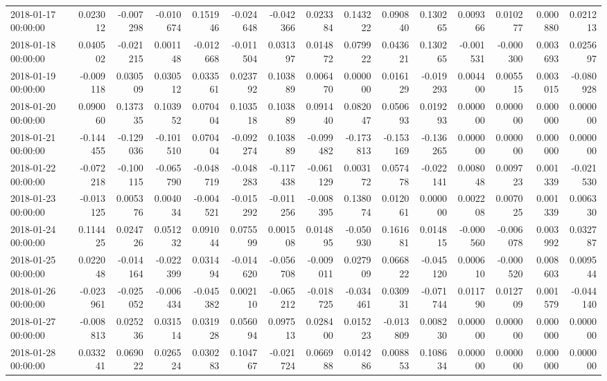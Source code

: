 \begin{tabular}{lrrrrrrrrrrrrrr}
2018-01-17 00:00:00 & 0.023012 & -0.007298 & -0.010674 & 0.151946 & -0.024648 & -0.042366 & 0.023384 & 0.143222 & 0.090840 & 0.130265 & 0.009366 & 0.010277 & 0.000880 & 0.021213 \\
2018-01-18 00:00:00 & 0.040502 & -0.021215 & 0.001148 & -0.012668 & -0.011504 & 0.031397 & 0.014872 & 0.079922 & 0.043621 & 0.130265 & -0.001531 & -0.000300 & 0.003693 & 0.025697 \\
2018-01-19 00:00:00 & -0.009118 & 0.030509 & 0.030512 & 0.033561 & 0.023792 & 0.103889 & 0.006470 & 0.000000 & 0.016129 & -0.019293 & 0.004400 & 0.005515 & 0.003015 & -0.080928 \\
2018-01-20 00:00:00 & 0.090060 & 0.137335 & 0.103952 & 0.070404 & 0.103518 & 0.103889 & 0.091440 & 0.082047 & 0.050693 & 0.019293 & 0.000000 & 0.000000 & 0.000000 & 0.000000 \\
2018-01-21 00:00:00 & -0.144455 & -0.129036 & -0.101510 & 0.070404 & -0.092274 & 0.103889 & -0.099482 & -0.173813 & -0.153169 & -0.136265 & 0.000000 & 0.000000 & 0.000000 & 0.000000 \\
2018-01-22 00:00:00 & -0.072218 & -0.100115 & -0.065790 & -0.048719 & -0.048283 & -0.117438 & -0.061129 & 0.003172 & 0.057478 & -0.022141 & 0.008048 & 0.009723 & 0.001339 & -0.021530 \\
2018-01-23 00:00:00 & -0.013125 & 0.005376 & 0.004034 & -0.004521 & -0.015292 & -0.011256 & -0.008395 & 0.138074 & 0.012061 & 0.000000 & 0.002208 & 0.007025 & 0.001339 & 0.006330 \\
2018-01-24 00:00:00 & 0.114425 & 0.024726 & 0.051232 & 0.091044 & 0.075599 & 0.001508 & 0.014895 & -0.050930 & 0.161681 & 0.014815 & -0.000560 & -0.006078 & 0.003992 & 0.032787 \\
2018-01-25 00:00:00 & 0.022048 & -0.014164 & -0.022399 & 0.031494 & -0.014620 & -0.056708 & -0.009011 & 0.027909 & 0.066822 & -0.045120 & 0.000610 & -0.000520 & 0.008603 & 0.009544 \\
2018-01-26 00:00:00 & -0.023961 & -0.025052 & -0.006434 & -0.045382 & 0.002110 & -0.065212 & -0.018725 & -0.034461 & 0.030931 & -0.071744 & 0.011790 & 0.012709 & 0.001579 & -0.044140 \\
2018-01-27 00:00:00 & -0.008813 & 0.025236 & 0.031514 & 0.031928 & 0.056094 & 0.097513 & 0.028400 & 0.015223 & -0.013809 & 0.008230 & 0.000000 & 0.000000 & 0.000000 & 0.000000 \\
2018-01-28 00:00:00 & 0.033241 & 0.069022 & 0.026524 & 0.030283 & 0.104767 & -0.021724 & 0.066988 & 0.014286 & 0.008853 & 0.108634 & 0.000000 & 0.000000 & 0.000000 & 0.000000 \\

\end{tabular}
